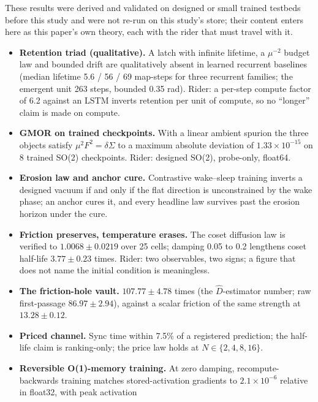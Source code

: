 \documentclass{article} %
\newcommand{\sci}[2]{\ensuremath{#1\times10^{#2}}}
\begin{document}
These results were derived and validated on designed or small trained testbeds before this study
and were not re-run on this study's store; their content enters here as this paper's own theory,
each with the rider that must travel with it. %
\begin{itemize}[leftmargin=*,itemsep=1pt]
\item \textbf{Retention triad (qualitative).} A latch with infinite lifetime, a $\mu^{-2}$ budget
  law and bounded drift are qualitatively absent in learned recurrent baselines (median lifetime 5.6
  / 56 / 69 map-steps for three recurrent families; the emergent unit 263 steps, bounded 0.35 rad).
  Rider: a per-step compute factor of 6.2 against an LSTM inverts retention per unit of compute, so
  no ``longer'' claim is made on compute. %
\item \textbf{GMOR on trained checkpoints.} With a linear ambient spurion the three objects satisfy
  $\mu^2F^2=\delta\Sigma$ to a maximum absolute deviation of \sci{1.33}{-15} on 8 trained SO(2)
  checkpoints. Rider: designed SO(2), probe-only, float64. %
\item \textbf{Erosion law and anchor cure.} Contrastive wake--sleep training inverts a designed
  vacuum if and only if the flat direction is unconstrained by the wake phase; an anchor cures it,
  and every headline law survives past the erosion horizon under the cure. %
\item \textbf{Friction preserves, temperature erases.} The coset diffusion law is verified to
  $1.0068\pm0.0219$ over 25 cells; damping 0.05 to 0.2 lengthens coset half-life
  $3.77\pm0.23$ times. Rider: two observables, two signs; a figure that does not name the initial
  condition is meaningless. %
\item \textbf{The friction-hole vault.} $107.77\pm4.78$ times (the $\hat D$-estimator number; raw
  first-passage $86.97\pm2.94$), against a scalar friction of the same strength at
  $13.28\pm0.12$. %
\item \textbf{Priced channel.} Sync time within 7.5\% of a registered prediction; the half-life
  claim is ranking-only; the price law holds at $N\in\{2,4,8,16\}$. %
\item \textbf{Reversible O(1)-memory training.} At zero damping, recompute-backwards training
  matches stored-activation gradients to \sci{2.1}{-6} relative in float32, with peak activation

\end{itemize}
\end{document}
